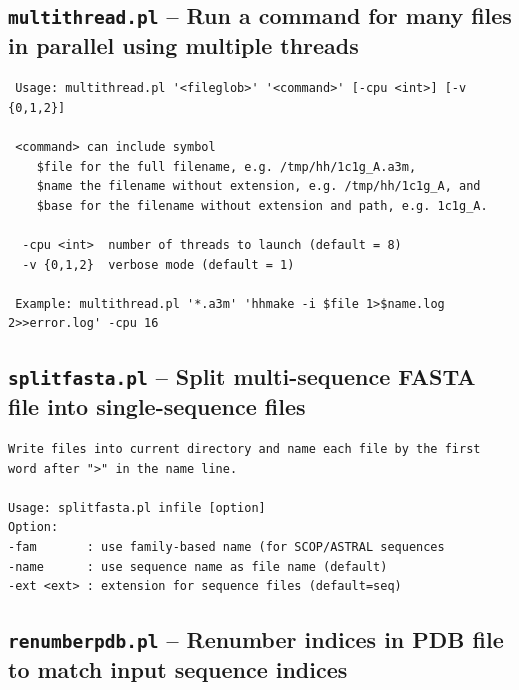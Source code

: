 \documentclass[11pt,a4paper]{article}
\begin{document}
\subsection{{\tt multithread.pl} -- Run a command for many files in parallel using multiple threads}

\small 
\begin{verbatim}
 Usage: multithread.pl '<fileglob>' '<command>' [-cpu <int>] [-v {0,1,2}]

 <command> can include symbol 
    $file for the full filename, e.g. /tmp/hh/1c1g_A.a3m, 
    $name the filename without extension, e.g. /tmp/hh/1c1g_A, and 
    $base for the filename without extension and path, e.g. 1c1g_A.

  -cpu <int>  number of threads to launch (default = 8)
  -v {0,1,2}  verbose mode (default = 1)

 Example: multithread.pl '*.a3m' 'hhmake -i $file 1>$name.log 2>>error.log' -cpu 16
\end{verbatim} 
\normalsize

\subsection{{\tt splitfasta.pl} -- Split multi-sequence FASTA file into single-sequence files}
\small 
\begin{verbatim}
Write files into current directory and name each file by the first word after ">" in the name line. 

Usage: splitfasta.pl infile [option]
Option:
-fam       : use family-based name (for SCOP/ASTRAL sequences
-name      : use sequence name as file name (default)
-ext <ext> : extension for sequence files (default=seq)
\end{verbatim} 
\normalsize

\subsection{{\tt renumberpdb.pl} -- Renumber indices in PDB file to match input sequence indices}
\end{document}
